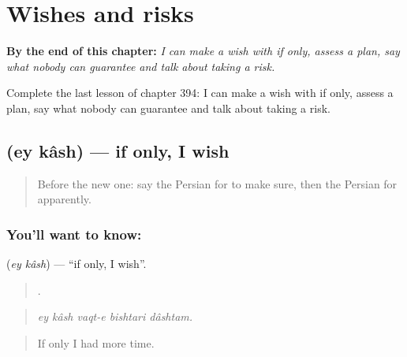 
\chapter{Wishes and risks}
\label{ch:fa-wishes-and-risks}

\begin{chapteropening}
\textbf{By the end of this chapter:} \emph{I can make a wish with if only, assess a plan, say what nobody can guarantee and talk about taking a risk.}

Complete the last lesson of chapter 394: I can make a wish with if only, assess a plan, say what nobody can guarantee and talk about taking a risk.
\end{chapteropening}

\section[\texorpdfstring{\fa{ای} \fa{کاش} (ey kâsh)}{ای کاش (ey kâsh)}]{  (ey kâsh) — if only, I wish}

\label{lesson:FA-C394-ey-kash}



\begin{quote}
Before the new one: say the Persian for to make sure, then the Persian for apparently.
\end{quote}

\subsection*{You'll want to know:  }
\textbf{ } (\emph{ey kâsh}) — \textquotedblleft{}if only, I wish\textquotedblright{}.

\begin{quote}
    .
\end{quote}

\begin{quote}
\emph{ey kâsh vaqt-e bishtari dâshtam.}
\end{quote}

\begin{quote}
If only I had more time.
\end{quote}


